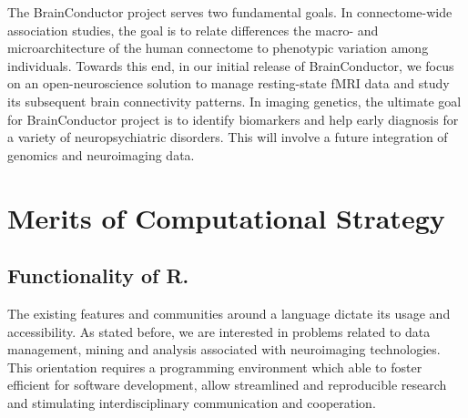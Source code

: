 \documentclass{nature}
\begin{document}
The BrainConductor project serves two fundamental goals. In connectome-wide
association studies, the goal is to relate differences the macro- and
microarchitecture of the human connectome to phenotypic variation among
individuals\cite{milham2012open}. Towards this end,
in our
initial release of BrainConductor, we focus on an open-neuroscience 
solution to manage resting-state fMRI data and study its
subsequent brain connectivity patterns. 
In imaging genetics, the ultimate goal
for BrainConductor project is to identify biomarkers and help early diagnosis
for a variety of neuropsychiatric disorders. This will involve a future
integration of genomics and neuroimaging data.


\section{Merits of Computational Strategy}

\subsection{Functionality of R.}
The existing features and communities around a language dictate
its usage and accessibility. As stated before, we are
interested in problems related to data management, mining and analysis
associated with neuroimaging technologies. This orientation requires
a programming environment which able to foster
efficient for software development, allow
streamlined and reproducible research and stimulating
interdisciplinary communication and cooperation.
\end{document}
